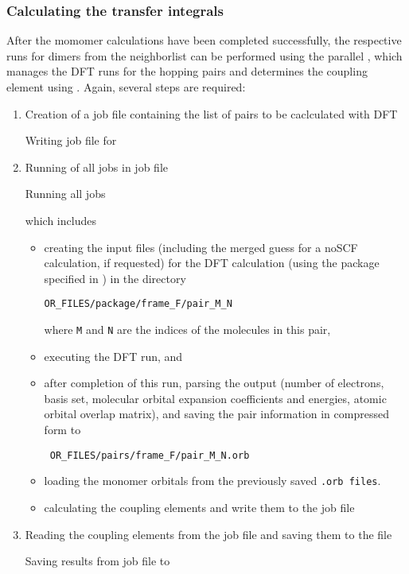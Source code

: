 \subsubsection{Calculating the transfer integrals}
\label{sec:idft}
After the momomer calculations have been completed successfully, the respective runs for dimers from the neighborlist can be performed using the parallel  \calculator, which manages the DFT runs for the hopping pairs and determines the coupling element using \dipro. Again, several steps are required:
\begin{enumerate}
\item Creation of a job file containing the list of pairs to be caclculated with DFT 
\begin{bclogo}[couleur=bgblue, arrondi =0 , logo=\bcinfo, barre=line,noborder=true]{\small Writing job file for }
\itshape {\small \ctpparallel \opt \xmloptions \sql \sqlstate \exe {} \job \wrt }
\end{bclogo}
\item Running of all jobs in job file 
\begin{bclogo}[couleur=bgblue, arrondi =0 , logo=\bcinfo, barre=line,noborder=true]{\small Running all  jobs}
\itshape {\small \ctpparallel \opt \xmloptions \sql \sqlstate \exe {} \job \run }
\end{bclogo}
which includes
\begin{itemize}
\item creating the input files (including the merged guess for a noSCF calculation, if requested) for the DFT calculation (using the package specified in \xmloptions) in the directory 
\begin{verbatim}
OR_FILES/package/frame_F/pair_M_N
\end{verbatim}
where {\tt M} and {\tt N} are the indices of the molecules in this pair,
\item executing the DFT run, and
\item after completion of this run, parsing the output (number of electrons, basis set, molecular orbital expansion coefficients and energies, atomic orbital overlap matrix), and saving the pair information in compressed form to
\begin{verbatim}
 OR_FILES/pairs/frame_F/pair_M_N.orb 
\end{verbatim}
\item loading the monomer orbitals from the previously saved {\tt *.orb files}.
\item calculating the coupling elements and write them to the job file
\end{itemize}
\item Reading the coupling elements from the job file and saving them to the \sqlstate file
\begin{bclogo}[couleur=bgblue, arrondi =0 , logo=\bcinfo, barre=line,noborder=true]{\small Saving  results from job file to \sqlstate}
\itshape {\small \ctpparallel \opt \xmloptions \sql \sqlstate \exe {} \job \rd }
\end{bclogo}
\end{enumerate}





